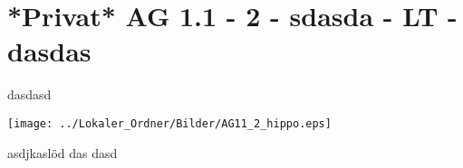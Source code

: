 \section{*Privat* AG 1.1 - 2 - sdasda - LT - dasdas}

\begin{beispiel}[AG 1.1]{1}
dasdasd

\texttt{[image: ../Lokaler\_Ordner/Bilder/AG11\_2\_hippo.eps]}

asdjkaslöd
das
dasd

\end{beispiel}